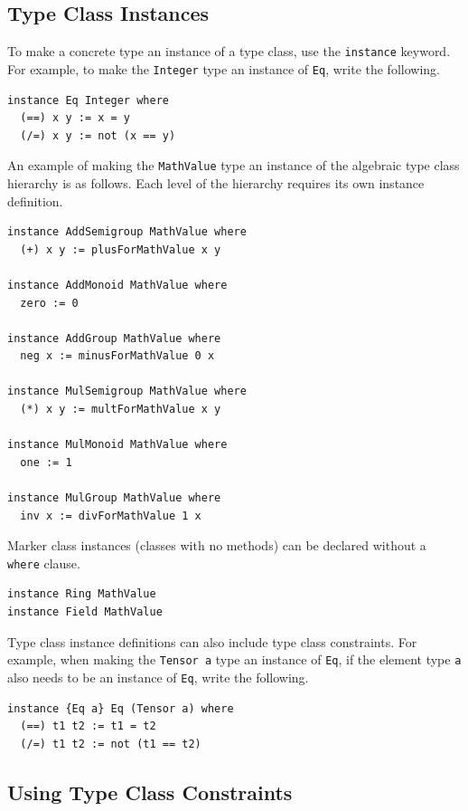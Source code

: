 \subsection{Type Class Instances}

To make a concrete type an instance of a type class, use the \lstinline{instance} keyword.
For example, to make the \lstinline{Integer} type an instance of \lstinline{Eq}, write the following.
\begin{lstlisting}[language=egison,numbers=none]
instance Eq Integer where
  (==) x y := x = y
  (/=) x y := not (x == y)
\end{lstlisting}

An example of making the \lstinline{MathValue} type an instance of the algebraic type class hierarchy is as follows.
Each level of the hierarchy requires its own instance definition.
\begin{lstlisting}[language=egison,numbers=none]
instance AddSemigroup MathValue where
  (+) x y := plusForMathValue x y

instance AddMonoid MathValue where
  zero := 0

instance AddGroup MathValue where
  neg x := minusForMathValue 0 x

instance MulSemigroup MathValue where
  (*) x y := multForMathValue x y

instance MulMonoid MathValue where
  one := 1

instance MulGroup MathValue where
  inv x := divForMathValue 1 x
\end{lstlisting}

Marker class instances (classes with no methods) can be declared without a \lstinline{where} clause.
\begin{lstlisting}[language=egison,numbers=none]
instance Ring MathValue
instance Field MathValue
\end{lstlisting}

Type class instance definitions can also include type class constraints.
For example, when making the \lstinline{Tensor a} type an instance of \lstinline{Eq}, if the element type \lstinline{a} also needs to be an instance of \lstinline{Eq}, write the following.
\begin{lstlisting}[language=egison,numbers=none]
instance {Eq a} Eq (Tensor a) where
  (==) t1 t2 := t1 = t2
  (/=) t1 t2 := not (t1 == t2)
\end{lstlisting}

\subsection{Using Type Class Constraints}

